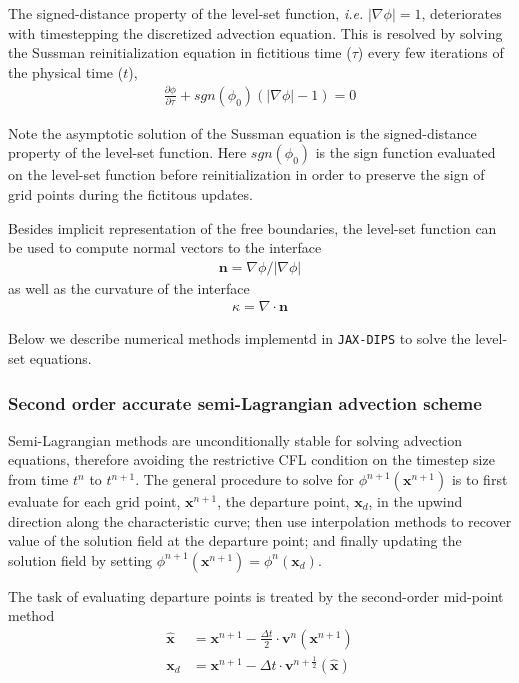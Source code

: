\documentclass{elsarticle}
\begin{document}
The signed-distance property of the level-set function, \textit{i.e.} $\vert \nabla \phi\vert =1 $, deteriorates with timestepping the discretized advection equation. This is resolved by solving the Sussman reinitialization equation \cite{SUSSMAN1994146} in fictitious time ($\tau$) every few iterations of the physical time ($t$),
\begin{align}
	\frac{\partial \phi}{\partial \tau} + sgn(\phi_0) (\vert \nabla \phi \vert - 1) = 0 \label{eq::sussman}
\end{align}

Note the asymptotic solution of the Sussman equation is the signed-distance property of the level-set function. Here $sgn(\phi_0)$ is the sign function evaluated on the level-set function before reinitialization in order to preserve the sign of grid points during the fictitous updates.

Besides implicit representation of the free boundaries, the level-set function can be used to compute normal vectors to the interface 
\begin{align*}
	\mathbf{n} = \nabla\phi / \vert \nabla \phi \vert 
\end{align*}
as well as the curvature of the interface
\begin{align*}
	\kappa = \nabla \cdot \mathbf{n}
\end{align*}



Below we describe numerical methods implementd in \texttt{JAX-DIPS} to solve the level-set equations.

\subsubsection{Second order accurate semi-Lagrangian advection scheme}
Semi-Lagrangian methods are unconditionally stable for solving advection equations, therefore avoiding the restrictive CFL condition on the timestep size from time $t^n$ to $t^{n+1}$. The general procedure to solve for $\phi^{n+1}(\mathbf{x}^{n+1})$ is to first evaluate for each grid point, $\mathbf{x}^{n+1}$, the departure point, $\mathbf{x}_d$, in the upwind direction along the characteristic curve; then use interpolation methods to recover value of the solution field at the departure point; and finally updating the solution field by setting $\phi^{n+1}(\mathbf{x}^{n+1})=\phi^n(\mathbf{x}_d)$.

The task of evaluating departure points is treated by the second-order mid-point method \cite{XIU2001658}
\begin{align*}
	\hat{\mathbf{x}} &= \mathbf{x}^{n+1} - \frac{\Delta t}{2} \cdot \mathbf{v}^n(\mathbf{x}^{n+1})\\
	\mathbf{x}_d &= \mathbf{x}^{n+1} - \Delta t \cdot \mathbf{v}^{n+\frac{1}{2}}(\hat{\mathbf{x}})
\end{align*}
\end{document}
